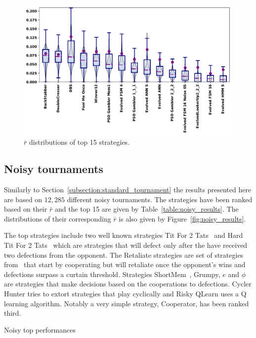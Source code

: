 \documentclass{article}
\begin{document}
\begin{figure}[!htbp]
    \centering
    \includegraphics[width=.8\textwidth]{../images/performance_standard.pdf}
    \caption{$\bar{r}$ distributions of top 15 strategies.}\label{fig:std_results}
\end{figure}

\subsection{Noisy tournaments}\label{subsection:noisy_tournament}

Similarly to Section~\ref{subsection:standard_tournament} the results presented
here are based on $12,285$ different noisy tournaments. The strategies have been
ranked based on their \(\bar{r}\) and the top 15 are given by
Table~\ref{table:noisy_results}. The distributions of their corresponding
\(\bar{r}\) is also given by Figure~\ref{fig:noisy_results}.

The top strategies include two well known strategies Tit For 2
Tats~\cite{Axelrod1980b} and Hard Tit For 2 Tats~\cite{Stewart2012} which are
strategies that will defect only after the have received two defections from the
opponent. The Retaliate strategies are set of strategies from~\cite{axelrodproject}
that start by cooperating but will retaliate once the opponent's wins and
defections surpass a curtain threshold. Strategies ShortMem~\cite{Carvalho2013},
Grumpy, $e$ and $\phi$ are strategies that make decisions based on the
cooperations to defections. Cycler Hunter tries to extort strategies that play
cyclically and Risky QLearn uses a Q learning algorithm. Notably a very simple
strategy, Cooperator, has been ranked third.

\begin{table}[!htbp]
    \centering
    \resizebox{.28\textwidth}{!}{
    }
    \caption{Noisy top performances}\label{table:noisy_results}
\end{table}
\end{document}
